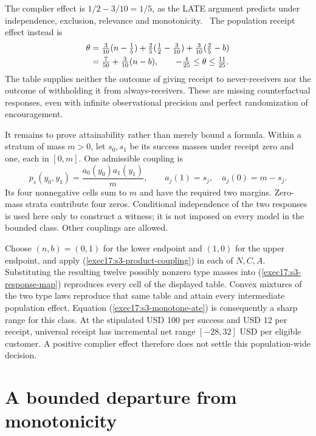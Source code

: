 The complier effect is $1/2-3/10=1/5$, as the LATE argument predicts
under independence, exclusion, relevance and
monotonicity.~\citep{angrist1996}
The population receipt effect instead is
\begin{align}
 \theta
 &=\tfrac{3}{10}(n-\tfrac15)
   +\tfrac25(\tfrac12-\tfrac3{10})
   +\tfrac3{10}(\tfrac25-b) \notag\\
 &=\tfrac7{50}+\tfrac3{10}(n-b),
 \qquad
 -\tfrac4{25}\leq\theta\leq\tfrac{11}{25}.
 \label{exec17:s3-monotone-ate}
\end{align}
The table supplies neither the outcome of giving receipt to never-receivers
nor the outcome of withholding it from always-receivers.
These are missing counterfactual responses, even with infinite observational
precision and perfect randomization of encouragement.

It remains to prove attainability rather than merely bound a formula.
Within a stratum of mass $m>0$, let $s_0,s_1$ be its success masses
under receipt zero and one, each in $[0,m]$. One admissible coupling is
\begin{equation}
 p_s(y_0,y_1)=
 \frac{a_0(y_0)a_1(y_1)}{m},\qquad
 a_j(1)=s_j,\quad a_j(0)=m-s_j .
 \label{exec17:s3-product-coupling}
\end{equation}
Its four nonnegative cells sum to $m$ and have the required two margins.
Zero-mass strata contribute four zeros. Conditional independence of the two
responses is used here only to construct a witness; it is not imposed on
every model in the bounded class. Other couplings are allowed.

Choose $(n,b)=(0,1)$ for the lower endpoint and $(1,0)$ for the upper
endpoint, and apply (\ref{exec17:s3-product-coupling}) in each of $N,C,A$.
Substituting the resulting twelve possibly nonzero type masses into
(\ref{exec17:s3-response-map}) reproduces every cell of the displayed
table. Convex mixtures of the two type laws reproduce that same table
and attain every intermediate population effect. Equation
(\ref{exec17:s3-monotone-ate}) is consequently a sharp range for this
class. At the stipulated USD 100 per success and USD 12 per receipt,
universal receipt has incremental net range $[-28,32]$ USD per eligible
customer. A positive complier effect therefore does not settle this
population-wide decision.~\citep{exec17_s3_sensitivity}

\section{A bounded departure from monotonicity}
\label{exec17:s3-defiers}


